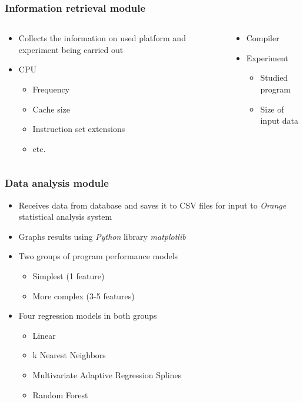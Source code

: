 \documentclass{beamer}
\begin{document}
\begin{frame}
\frametitle{Information retrieval module}

	\begin{columns}[T]
		\begin{column}{0.5\textwidth}
			\begin{itemize}
				\item Collects the information on used platform and experiment being carried out
				\item CPU
				\begin{itemize}
					\item Frequency
					\item Cache size
					\item Instruction set extensions
					\item etc.
				\end{itemize}

			\end{itemize}
		\end{column}
		\begin{column}{0.5\textwidth}
			\begin{itemize}
				\item Compiler
				\item Experiment
				\begin{itemize}
					\item Studied program
					\item Size of input data
				\end{itemize}
			\end{itemize}
		\end{column}
	\end{columns}

\end{frame}

\begin{frame}
\frametitle{Data analysis module}

\begin{itemize}
	\item Receives data from database and saves it to CSV files for input to \textit{Orange} statistical analysis system
	\item Graphs results using \textit{Python} library \textit{matplotlib}
	\item Two groups of program performance models
	\begin{itemize}
		\item Simplest (1 feature)
		\item More complex (3-5 features)
	\end{itemize}
	\item Four regression models in both groups
	\begin{itemize}
		\item Linear
		\item k Nearest Neighbors
		\item Multivariate Adaptive Regression Splines
		\item Random Forest
	\end{itemize}
\end{itemize}

\end{frame}
\end{document}
